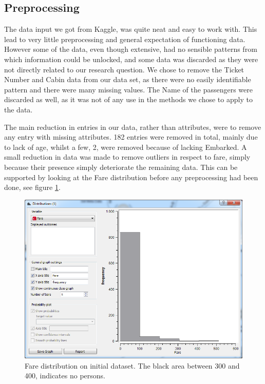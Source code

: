\documentclass[a4paper,11pt]{article}
\begin{document}
\subsection{Preprocessing}
\label{sec:preproc}
The data input we got from Kaggle\cite{kaggleData}, was quite neat and easy to work with. This lead to very little preprocessing and general expectation of functioning data. 
However some of the data, even though extensive, had no sensible patterns from which information could be unlocked, and some data was discarded as they were not directly related to our research question.
We chose to remove the Ticket Number and Cabin data from our data set, as there were no easily identifiable pattern and there were many missing values. 
The Name of the passengers were discarded as well, as it was not of any use in the methods we chose to apply to the data. 

The main reduction in entries in our data, rather than attributes, were to remove any entry with missing attributes. 182 entries were removed in total, mainly due to lack of age, whilst a few, 2, were removed because of lacking Embarked. 
A small reduction in data was made to remove outliers in respect to fare, simply because their presence simply deteriorate the remaining data. This can be supported by looking at the Fare distribution before any preprocessing had been done, see figure \ref{farepreprocess}.

\begin{figure}[h]
\begin{center}
	\includegraphics[scale=0.6]{FarePreprocess}
\end{center}
\caption{Fare distribution on initial dataset. The black area between 300 and 400, indicates no persons.}
\label{farepreprocess}
\end{figure}
\end{document}
